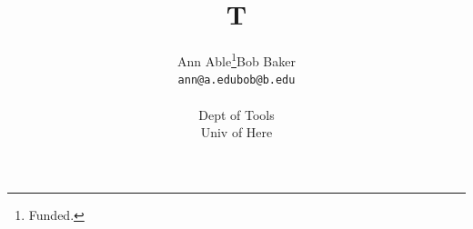 \documentclass{eptcs}
\title{T}
\author{
\begin{tabular}{c@{\qquad}c}
Ann Able\thanks{Funded.} & Bob Baker\\
\texttt{\footnotesize ann@a.edu} & \texttt{\footnotesize bob@b.edu}
\end{tabular}
\medskip
\\{\footnotesize Dept of Tools}
\\{\footnotesize Univ of Here}
}

\maketitle
Text.

